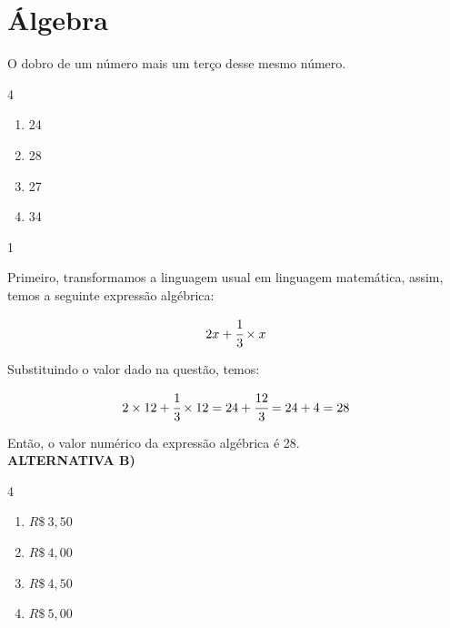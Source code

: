 \section{Álgebra}


O dobro de um número mais um terço desse mesmo número.

\begin{multicols}{4}
    \begin{enumerate}[label=\alph*) ]
        \item 24
        \item 28
        \item 27
        \item 34
    \end{enumerate}
\end{multicols}

\begin{solucoes}{1}
\solucao

    Primeiro, transformamos a linguagem usual em linguagem matemática, assim, temos a seguinte expressão algébrica:

    \begin{equation*}
        2x + \cfrac{1}{3}\times x
    \end{equation*}

    Substituindo o valor dado na questão, temos:
    
    \begin{equation*}
        2 \times 12 + \cfrac{1}{3} \times 12 = 24 + \cfrac{12}{3} = 24 + 4 = 28
    \end{equation*}

    Então, o valor numérico da expressão algébrica é 28. \\
    \textbf{ALTERNATIVA B)}
\end{solucoes}

        \begin{multicols}{4}
            \begin{enumerate}[label=\alph*)]
                \item $R\$ \ 3,50$
                \item $R\$ \ 4,00$
                \item $R\$ \ 4,50$
                \item $R\$ \ 5,00$
            \end{enumerate}
        \end{multicols}


